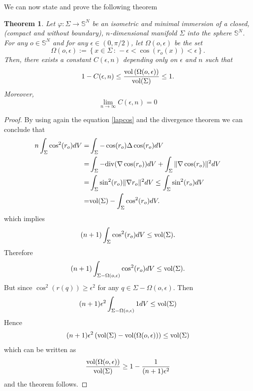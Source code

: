 \documentclass{amsart}
\newtheorem{theorem}{Theorem}[section]
\theoremstyle{definition}
\theoremstyle{remark}
\begin{document}
We can now state and prove the following theorem

\begin{theorem}
Let $\varphi: \Sigma\to \mathbb{S}^N$ be an isometric and minimal immersion of a closed, (compact and without boundary), $n$-dimensional manifold $\Sigma$ into the sphere  $\mathbb{S}^N$. For any $o\in\mathbb{S}^N$ and for any $\epsilon\in (0,\pi/2)$,  let $\Omega(o,\epsilon)$ be the set
$$
\Omega(o,\epsilon):=\left\lbrace x\in \Sigma\, : \, -\epsilon<\cos(r_o(x))<\epsilon \right\rbrace.
$$
Then,   there exists a constant $C(\epsilon,n)$ depending only on $\epsilon$ and $n$ such that
$$
1-C(\epsilon,n)\leq \frac{{\rm vol}\left(\Omega(o,\epsilon)\right)}{{\rm vol}(\Sigma)}\leq 1.
$$
Moreover,
$$
\lim_{n\to\infty}C(\epsilon,n)=0
$$
\end{theorem}
\begin{proof}
By using again the equation \eqref{lapcos} and the divergence theorem we can conclude that
$$
\begin{aligned}
n\int_\Sigma \cos^2(r_o)dV=&\int_\Sigma -\cos(r_o)\Delta\cos(r_o)dV\\
=&\int_\Sigma -{\rm div}(\nabla \cos(r_o))dV+\int_\Sigma\Vert \nabla  \cos(r_o)\Vert^2dV\\
=&\int_\Sigma \sin^2(r_o)\Vert \nabla r_o\Vert^2dV\leq \int_\Sigma \sin^2(r_o)dV\\
=&{\rm vol}(\Sigma)- \int_\Sigma \cos^2(r_o)dV.
\end{aligned}
$$
which implies
$$
(n+1)\int_\Sigma \cos^2(r_o)dV\leq {\rm vol}(\Sigma).
$$
Therefore
$$
(n+1)\int_{\Sigma-\Omega(o,\epsilon)} \cos^2(r_o)dV\leq {\rm vol}(\Sigma).
$$
But since $\cos^2(r(q))\geq\epsilon^2$ for any $q \in\Sigma-\Omega(o,\epsilon)$. Then
 $$
(n+1)\epsilon^2\int_{\Sigma-\Omega(o,\epsilon)} 1dV\leq {\rm vol}(\Sigma)
$$
Hence
$$
(n+1)\epsilon^2\left({\rm vol}(\Sigma)-{\rm vol}(\Omega(o,\epsilon))\right)\leq {\rm vol}(\Sigma)
$$
which can be written as
$$
\frac{{\rm vol}(\Omega(o,\epsilon))}{{\rm vol}(\Sigma)}\geq 1-\frac{1}{(n+1)\epsilon^2}
$$
and the theorem follows.
\end{proof}
\end{document}

